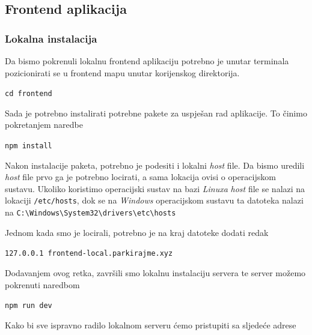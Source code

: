 		        
				\pagebreak
		

				\subsection{Frontend aplikacija}
	        
						\subsubsection*{Lokalna instalacija}
	        
	          		Da bismo pokrenuli lokalnu frontend aplikaciju potrebno je unutar terminala pozicionirati se u frontend mapu unutar korijenskog direktorija. 
	            
								\begin{center}
										\texttt{cd frontend}
								\end{center}
								
								Sada je potrebno instalirati potrebne pakete za uspješan rad aplikacije. To činimo pokretanjem naredbe
								
								\begin{center}
										\texttt{npm install}
								\end{center}
								
								Nakon instalacije paketa, potrebno je podesiti i lokalni \textit{host} file. Da bismo uredili \textit{host} file prvo ga je potrebno locirati, a sama lokacija ovisi o operacijskom sustavu. Ukoliko koristimo operacijski sustav na bazi \textit{Linuxa} \textit{host} file se nalazi na lokaciji \texttt{/etc/hosts}, dok se na \textit{Windows} operacijskom sustavu ta datoteka nalazi na \verb$C:\Windows\System32\drivers\etc\hosts$
								
								Jednom kada smo je locirali, potrebno je na kraj datoteke dodati redak

								\begin{center}
										\texttt{127.0.0.1	frontend-local.parkirajme.xyz}
								\end{center}
								
								Dodavanjem ovog retka, završili smo lokalnu instalaciju servera te server možemo pokrenuti naredbom
								
								\begin{center}
										\texttt{npm run dev}
								\end{center}
								
								Kako bi sve ispravno radilo lokalnom serveru ćemo pristupiti sa sljedeće adrese

